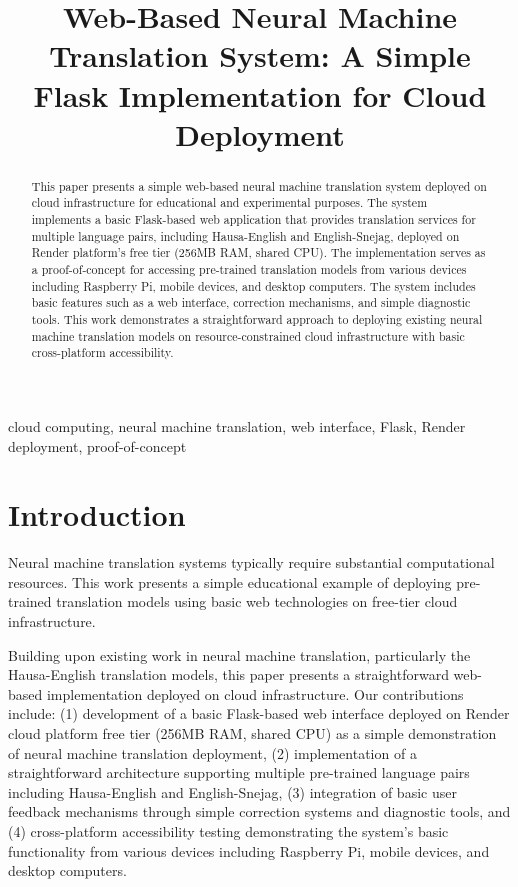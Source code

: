 \documentclass[conference]{IEEEtran}
\begin{document}
\title{Web-Based Neural Machine Translation System: A Simple Flask Implementation for Cloud Deployment}

\author{
}
\maketitle

\begin{abstract}
This paper presents a simple web-based neural machine translation system deployed on cloud infrastructure for educational and experimental purposes. The system implements a basic Flask-based web application that provides translation services for multiple language pairs, including Hausa-English and English-Snejag, deployed on Render platform's free tier (256MB RAM, shared CPU). The implementation serves as a proof-of-concept for accessing pre-trained translation models from various devices including Raspberry Pi, mobile devices, and desktop computers. The system includes basic features such as a web interface, correction mechanisms, and simple diagnostic tools. This work demonstrates a straightforward approach to deploying existing neural machine translation models on resource-constrained cloud infrastructure with basic cross-platform accessibility.
\end{abstract}

\begin{IEEEkeywords}
cloud computing, neural machine translation, web interface, Flask, Render deployment, proof-of-concept
\end{IEEEkeywords}

\section{Introduction}

Neural machine translation systems typically require substantial computational resources. This work presents a simple educational example of deploying pre-trained translation models using basic web technologies on free-tier cloud infrastructure.

Building upon existing work in neural machine translation, particularly the Hausa-English translation models, this paper presents a straightforward web-based implementation deployed on cloud infrastructure. Our contributions include: (1) development of a basic Flask-based web interface deployed on Render cloud platform free tier (256MB RAM, shared CPU) as a simple demonstration of neural machine translation deployment, (2) implementation of a straightforward architecture supporting multiple pre-trained language pairs including Hausa-English and English-Snejag, (3) integration of basic user feedback mechanisms through simple correction systems and diagnostic tools, and (4) cross-platform accessibility testing demonstrating the system's basic functionality from various devices including Raspberry Pi, mobile devices, and desktop computers.
\end{document}
